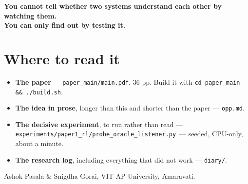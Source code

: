 \documentclass[11pt]{article}
\begin{document}
\vspace{0.6cm}
\begin{center}
\begin{tcolorbox}[colback=accentdeep, colframe=accentdeep, width=0.92\textwidth, arc=3pt, coltext=white]
\centering\Large
\textbf{You cannot tell whether two systems understand each other by watching them.}\\[4pt]
\textbf{You can only find out by testing it.}
\end{tcolorbox}
\end{center}

\vspace{0.7cm}

\section*{Where to read it}

\begin{itemize}[leftmargin=*, itemsep=3pt]
  \item \textbf{The paper} --- \texttt{paper\_main/main.pdf}, 36 pp. Build it with
        \texttt{cd paper\_main \&\& ./build.sh}.
  \item \textbf{The idea in prose}, longer than this and shorter than the paper ---
        \texttt{opp.md}.
  \item \textbf{The decisive experiment}, to run rather than read --- \\
        \texttt{experiments/paper1\_rl/probe\_oracle\_listener.py}\ --- seeded, CPU-only,
        about a minute.
  \item \textbf{The research log}, including everything that did not work ---
        \texttt{diary/}.
\end{itemize}

\vspace{0.3cm}
\noindent\small Ashok Pasala \& Snigdha Gorai, VIT-AP University, Amaravati.
\end{document}
